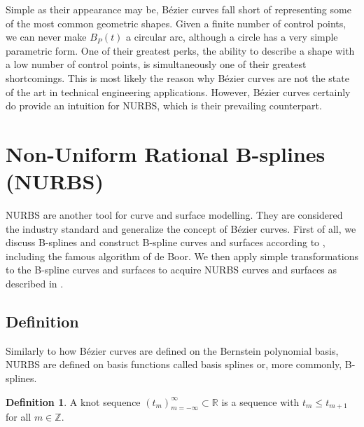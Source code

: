 \documentclass[a4paper, 11pt]{report}
\theoremstyle{definition}
\newtheorem{definition}{Definition}[section]
\begin{document}
	Simple as their appearance may be, Bézier curves fall short of representing some of the most common geometric shapes. Given a finite number of control points, we can never make $B_P(t)$ a circular arc, although a circle has a very simple parametric form. One of their greatest perks, the ability to describe a shape with a low number of control points, is simultaneously one of their greatest shortcomings. This is most likely the reason why Bézier curves are not the state of the art in technical engineering applications. However, Bézier curves certainly do provide an intuition for NURBS, which is their prevailing counterpart.

\section{Non-Uniform Rational B-splines (NURBS)}
	NURBS are another tool for curve and surface modelling. They are considered the industry standard and generalize the concept of Bézier curves. First of all, we discuss B-splines and construct B-spline curves and surfaces according to \cite{Farin2001}, including the famous algorithm of de Boor. We then apply simple transformations to the B-spline curves and surfaces to acquire NURBS curves and surfaces as described in \cite{Piegl1997}.

\subsection{Definition}
	Similarly to how Bézier curves are defined on the Bernstein polynomial basis, NURBS are defined on basis functions called basis splines or, more commonly, B-splines.

	\begin{definition}
		A knot sequence $(t_m)_{m=-\infty}^{\infty} \subset \mathbb{R}$ is a sequence with $t_{m} \leq t_{m+1}$ for all $m \in \mathbb{Z}$.
	\end{definition}
\end{document}
